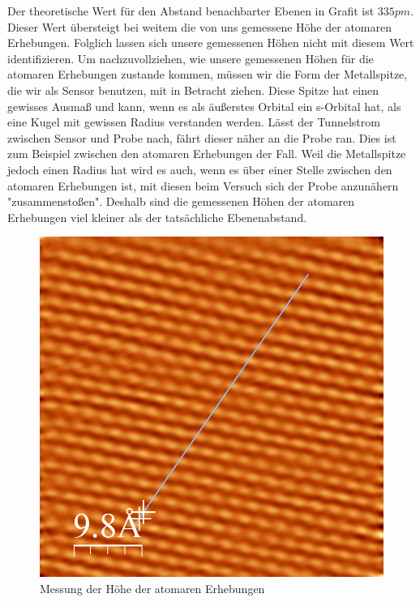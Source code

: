 \documentclass[10pt,a4paper]{article}
\begin{document}
Der theoretische Wert für den Abstand benachbarter Ebenen in Grafit ist $335 pm$. Dieser Wert übersteigt bei weitem die von uns gemessene Höhe der atomaren Erhebungen. Folglich lassen sich unsere gemessenen Höhen nicht mit diesem Wert identifizieren. Um nachzuvollziehen, wie unsere gemessenen Höhen für die atomaren Erhebungen zustande kommen, müssen wir die Form der Metallspitze, die wir als Sensor benutzen, mit in Betracht ziehen. Diese Spitze hat einen gewisses Ausmaß und kann, wenn es als äußerstes Orbital ein s-Orbital hat, als eine Kugel mit gewissen Radius verstanden werden. Lässt der Tunnelstrom zwischen Sensor und Probe nach, fährt dieser näher an die Probe ran. Dies ist zum Beispiel zwischen den atomaren Erhebungen der Fall. Weil die Metallspitze jedoch einen Radius hat wird es auch, wenn es über einer Stelle zwischen den atomaren Erhebungen ist, mit diesen beim Versuch sich der Probe anzunähern "zusammenstoßen". Deshalb sind die gemessenen Höhen der atomaren Erhebungen viel kleiner als der tatsächliche Ebenenabstand.

\begin{figure}[h]
	\centering
	
	\includegraphics[scale = 0.4]{hohenmessung11.png}
	
	\caption{Messung der Höhe der atomaren Erhebungen}
	\label{Messungerh3}
\end{figure}
\end{document}
